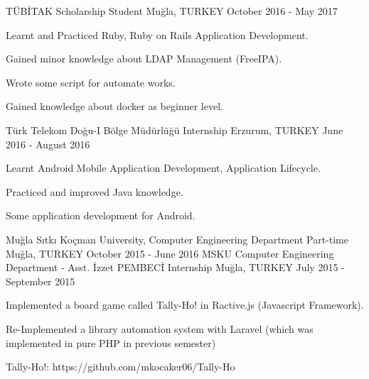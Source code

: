 \begin{cventries}
	\cventry
		{TÜBİTAK}
		{Scholarship Student}
		{Muğla, TURKEY}
		{October 2016 - May 2017}
		{
			\begin{cvitems}
				\item {Learnt and Practiced Ruby, Ruby on Rails Application Development.}
				\item {Gained minor knowledge about LDAP Management (FreeIPA).}
				\item {Wrote some script for automate works.}
				\item {Gained knowledge about docker as beginner level.}
			\end{cvitems}
		}
	\cventry
		{Türk Telekom Doğu-I Bölge Müdürlüğü}
		{Internship}
		{Erzurum, TURKEY}
		{June 2016 - August 2016}
		{
			\begin{cvitems}
				\item {Learnt Android Mobile Application Development, Application Lifecycle.}
				\item {Practiced and improved Java knowledge.}
				\item {Some application development for Android.}
			\end{cvitems}
		}
	\cventry
		{Muğla Sıtkı Koçman University, Computer Engineering Department}
		{Part-time}
		{Muğla, TURKEY}
		{October 2015 - June 2016}
		{}
	\cventry
		{MSKU Computer Engineering Department - Asst. İzzet PEMBECİ}
		{Internship}
		{Muğla, TURKEY}
		{July 2015 - September 2015}
		{
		  \begin{cvitems}
			\item {Implemented a board game called Tally-Ho! in Ractive.js (Javascript Framework).}
			\item {Re-Implemented a library automation system with Laravel (which was implemented in pure PHP in previous semester)}
			\item {Tally-Ho!: https://github.com/mkocaker06/Tally-Ho}
		  \end{cvitems}
		}

\end{cventries}

